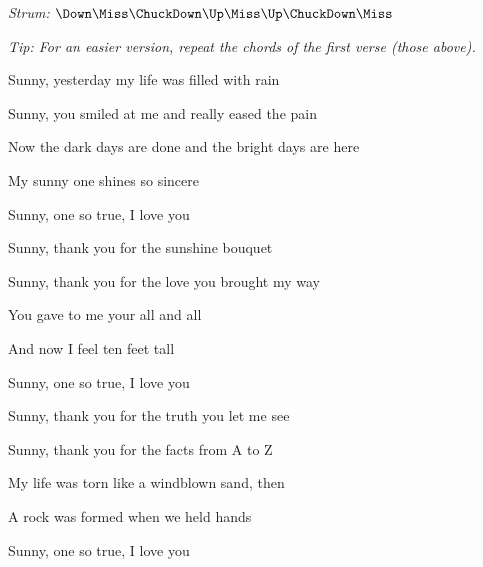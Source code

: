 \begin{song}


\begin{strumbox}
\textit{Strum:} $\Down\Miss\ChuckDown\Up\Miss\Up\ChuckDown\Miss$
\end{strumbox}

\begin{hchordbox}
\hspace{-2em} %
\end{hchordbox}

\large

\bigskip

{
\smaller \it Tip: For an easier version, repeat the chords of the first verse (those above).
}

\bigskip

Sunny,  yesterday my life was filled with rain  \par
{}Sunny,  you smiled at me and  really eased the pain  \par
Now the dark days are done and the bright days are here \par
{}My sunny one shines so sincere \par
{}Sunny, one so true, I love you \par

\bigskip

Sunny,  thank you for the sunshine bouquet  \par
{}Sunny,  thank you for the love you brought my way  \par
You gave to me your all and all \par
And now I feel ten feet tall \par
{}Sunny, one so true, I love you  \par

\bigskip

Sunny,  thank you for the truth you let me see  \par
{}Sunny,  thank you for the facts from A to Z  \par
{}My life was torn like a windblown sand, then \par
{}A rock was formed when we held hands \par
{}Sunny, one so true, I love you  \par


\end{song}
